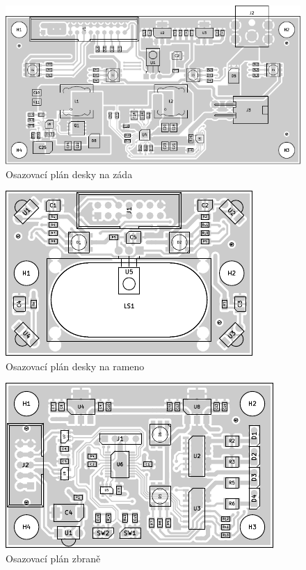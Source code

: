 \begin{figure}[h]
    \centering
    \includegraphics[page=1, width=\textwidth]{pcb/back-placement}
    \caption{Osazovací plán desky na záda}
\end{figure}
\begin{figure}[h]
    \centering
    \includegraphics[page=1, width=\textwidth]{pcb/shoulder-placement}
    \caption{Osazovací plán desky na rameno}
\end{figure}
\begin{figure}[h]
    \centering
    \includegraphics[page=1, width=\textwidth]{pcb/gun-placement}
    \caption{Osazovací plán zbraně}
\end{figure}
